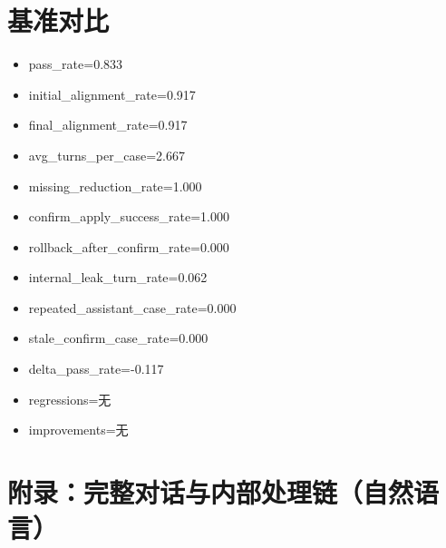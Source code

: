 \documentclass[11pt]{ctexart}
\begin{document}
\section{基准对比}
\begin{itemize}
\item pass\_rate=0.833
\item initial\_alignment\_rate=0.917
\item final\_alignment\_rate=0.917
\item avg\_turns\_per\_case=2.667
\item missing\_reduction\_rate=1.000
\item confirm\_apply\_success\_rate=1.000
\item rollback\_after\_confirm\_rate=0.000
\item internal\_leak\_turn\_rate=0.062
\item repeated\_assistant\_case\_rate=0.000
\item stale\_confirm\_case\_rate=0.000
\item delta\_pass\_rate=-0.117
\item regressions=无
\item improvements=无
\end{itemize}
\appendix
\section{附录：完整对话与内部处理链（自然语言）}
\end{document}
